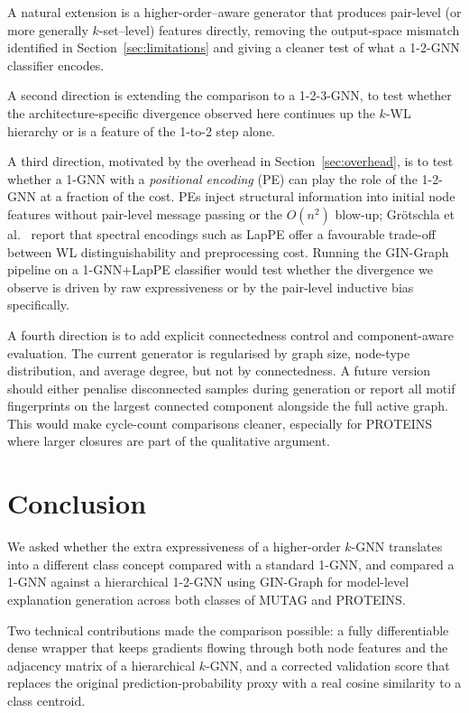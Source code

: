 \documentclass[12pt,a4paper]{article}
\begin{document}
A natural extension is a higher-order--aware generator that produces pair-level (or more generally $k$-set--level) features directly, removing the output-space mismatch identified in Section~\ref{sec:limitations} and giving a cleaner test of what a 1-2-GNN classifier encodes.

A second direction is extending the comparison to a 1-2-3-GNN, to test whether the architecture-specific divergence observed here continues up the $k$-WL hierarchy or is a feature of the 1-to-2 step alone.

A third direction, motivated by the overhead in Section~\ref{sec:overhead}, is to test whether a 1-GNN with a \emph{positional encoding} (PE) can play the role of the 1-2-GNN at a fraction of the cost. PEs inject structural information into initial node features without pair-level message passing or the $O(n^2)$ blow-up; Gr\"otschla et al.~\cite{grotschla2026benchmarking} report that spectral encodings such as LapPE offer a favourable trade-off between WL distinguishability and preprocessing cost. Running the GIN-Graph pipeline on a 1-GNN+LapPE classifier would test whether the divergence we observe is driven by raw expressiveness or by the pair-level inductive bias specifically.

A fourth direction is to add explicit connectedness control and component-aware evaluation. The current generator is regularised by graph size, node-type distribution, and average degree, but not by connectedness. A future version should either penalise disconnected samples during generation or report all motif fingerprints on the largest connected component alongside the full active graph. This would make cycle-count comparisons cleaner, especially for PROTEINS where larger closures are part of the qualitative argument.

\section{Conclusion}
\label{sec:conclusion}

We asked whether the extra expressiveness of a higher-order $k$-GNN translates into a different class concept compared with a standard 1-GNN, and compared a 1-GNN against a hierarchical 1-2-GNN using GIN-Graph for model-level explanation generation across both classes of MUTAG and PROTEINS.

Two technical contributions made the comparison possible: a fully differentiable dense wrapper that keeps gradients flowing through both node features and the adjacency matrix of a hierarchical $k$-GNN, and a corrected validation score that replaces the original prediction-probability proxy with a real cosine similarity to a class centroid.
\end{document}
